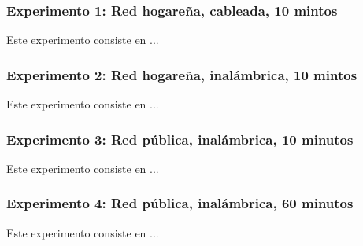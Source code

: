 \subsubsection{Experimento 1: Red hogareña, cableada, 10 mintos}

Este experimento consiste en ... %

\subsubsection{Experimento 2: Red hogareña, inalámbrica, 10 mintos}

Este experimento consiste en ... %

\subsubsection{Experimento 3: Red pública, inalámbrica, 10 minutos}

Este experimento consiste en ... %

\subsubsection{Experimento 4: Red pública, inalámbrica, 60 minutos}

Este experimento consiste en ... %
